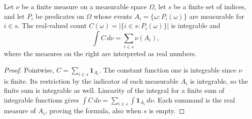 \begin{lemma}
Let $\nu$ be a finite measure on a measurable space $\Omega$, let $s$ be a
finite set of indices, and let $P_i$ be predicates on $\Omega$ whose events
$A_i=\{\omega:P_i(\omega)\}$ are measurable for $i\in s$.
The real-valued count $C(\omega)=|\{i\in s:P_i(\omega)\}|$ is integrable and
\[
\int C\,d\nu=\sum_{i\in s}\nu(A_i),
\]
where the measures on the right are interpreted as real numbers.
\end{lemma}
\begin{proof}
Pointwise, $C=\sum_{i\in s}\mathbf1_{A_i}$. The constant function one is
integrable since $\nu$ is finite. Its restriction by the indicator of each
measurable $A_i$ is integrable, so the finite sum is integrable as well.
Linearity of the integral for a finite sum of integrable functions gives
$\int C\,d\nu=\sum_{i\in s}\int\mathbf1_{A_i}\,d\nu$.
Each summand is the real measure of $A_i$, proving the formula, also when
$s$ is empty.
\end{proof}

